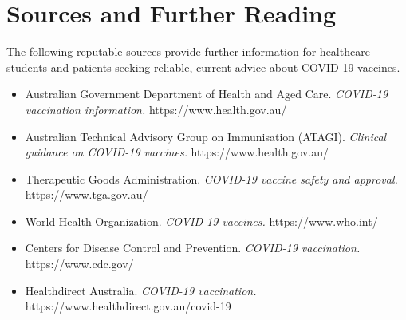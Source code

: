 \section*{Sources and Further Reading}
The following reputable sources provide further information for healthcare students and patients seeking reliable, current advice about COVID-19 vaccines.

\begin{itemize}
    \item Australian Government Department of Health and Aged Care. \textit{COVID-19 vaccination information.} https://www.health.gov.au/
    \item Australian Technical Advisory Group on Immunisation (ATAGI). \textit{Clinical guidance on COVID-19 vaccines.} https://www.health.gov.au/
    \item Therapeutic Goods Administration. \textit{COVID-19 vaccine safety and approval.} https://www.tga.gov.au/
    \item World Health Organization. \textit{COVID-19 vaccines.} https://www.who.int/
    \item Centers for Disease Control and Prevention. \textit{COVID-19 vaccination.} https://www.cdc.gov/
    \item Healthdirect Australia. \textit{COVID-19 vaccination.} https://www.healthdirect.gov.au/covid-19
\end{itemize}
